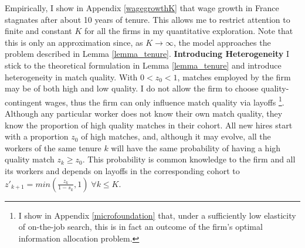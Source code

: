Empirically, I show in Appendix \ref{wagegrowthK} that wage growth in France stagnates after about 10 years of tenure.  This allows me to restrict attention to finite and constant $K$ for all the firms in my quantitative exploration. Note that this is only an approximation since, as $K\rightarrow\infty$, the model approaches the problem described in Lemma \ref{lemma_tenure}.
\newline
\textbf{Introducing Heterogeneity}  I stick to the theoretical formulation in Lemma \ref{lemma_tenure} and introduce heterogeneity in match quality. With $0<z_0<1$, matches employed by the firm may be of both high and low quality. I do not allow the firm to choose quality-contingent wages, thus the firm can only influence match quality via layoffs \footnote{I show in Appendix \ref{microfoundation} that, under a sufficiently low elasticity of on-the-job search, this is in fact an outcome of the firm's optimal information allocation problem.}. \\
Although any particular worker does not know their own match quality, they know the proportion of high quality matches in their cohort. All new hires start with a proportion $z_0$ of high matches, and, although it may evolve, all the workers of the same tenure $k$ will have the same probability of having a high quality match $z_k\geq z_0$. This probability is common knowledge to the firm and all its workers and depends on layoffs in the corresponding cohort to $z'_{k+1}=min(\frac{z_k}{1-s_k},1)\; \forall k\leq K$.
\\

